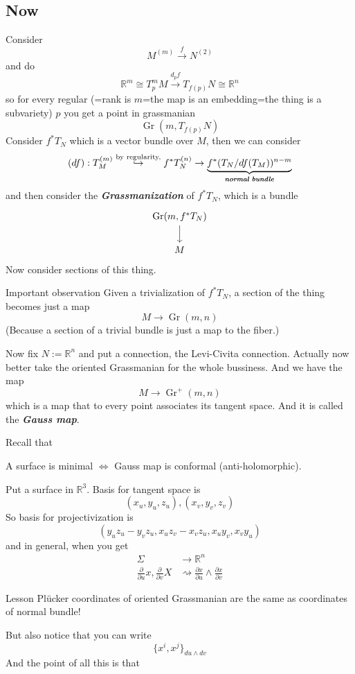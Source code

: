 \subsection{ Now}
Consider 
\[M^{(m)}\xrightarrow{f}N^{(2)}\]
and do
\[\mathbb{R}^m \cong T_p^m M \xrightarrow{d_pf}T_{f(p)}N \cong \mathbb{R}^n\]
so for every regular (=rank is \(m\)=the map is an embedding=the thing is a subvariety) \(p\) you get a point in grassmanian
\[\operatorname{Gr}(m,T_{f(p)}N)\]
Consider \(f^*T_N\) which is a vector bundle over \(M\), then we can consider
\[(df):T^{(m)}_M \overset{\text{by regularity,} }{\hookrightarrow } f^*T^{(n)}_N \to \underbrace{f^*(T_N / df(T_M))^{n-m}}_{\text{\textit{\textbf{normal bundle}}} }\]
and then consider the \textit{\textbf{Grassmanization}} of \(f^*T_N\), which is a bundle
\[\begin{tikzcd}
\operatorname{Gr}(m,f^*T_N)\arrow[d]\\
M
\end{tikzcd}\]
Now consider sections of this thing.

\begin{thing7}{Important observation}\leavevmode
 Given a trivialization of \(f^*T_N\), a section of the thing becomes just a map
 \[M \to \operatorname{Gr}(m,n)\]
 (Because a section of a trivial bundle is just a map to the fiber.) 
\end{thing7}

Now fix \(N:= \mathbb{R}^n\) and put a connection, the Levi-Civita connection. Actually now better take the oriented Grassmanian for the whole bussiness. And we have the map
\[M \to \operatorname{Gr}^+(m,n)\]
which is a map that to every point associates its tangent space. And it is called the \textit{\textbf{Gauss map}}.

Recall that
\begin{claim}\leavevmode
A surface is minimal \(\iff\) Gauss map is conformal (anti-holomorphic).
\end{claim}

Put a surface in \(\mathbb{R}^3\). Basis for tangent space is
\[(x_u,y_u,z_u), (x_v,y_v,z_v)\]
So basis for projectivization is
\[(y_uz_u-y_vz_u, x_uz_v-x_vz_u,x_uy_v,x_vy_u)\]
and in general, when you get
\begin{align*}
\Sigma&\to \mathbb{R}^n\\
\frac{\partial }{\partial u}x, \frac{\partial }{\partial v}X &\rightsquigarrow \frac{\partial x}{\partial u}\wedge \frac{\partial x}{\partial v}
\end{align*}
\begin{thing8}{Lesson}\leavevmode
Plücker coordinates of oriented Grassmanian are the same as coordinates of normal bundle!
\end{thing8}
But also notice that you can write
\[\{x^i,x^j\}_{du \wedge dv}\]
And the point of all this is that 

